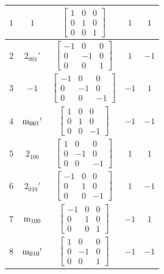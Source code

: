 \documentclass[fleqn,8pt]{jsarticle}
\begin{document}
\begin{longtable}{ccccc}
$ 1 $ & $ 1 $ & $ \begin{bmatrix} 1 & 0 & 0 \\ 0 & 1 & 0 \\ 0 & 0 & 1 \end{bmatrix} $ & $ 1 $ & $ 1 $ \\ \hline
$ 2 $ & $ 2{}_{001}{}' $ & $ \begin{bmatrix} -1 & 0 & 0 \\ 0 & -1 & 0 \\ 0 & 0 & 1 \end{bmatrix} $ & $ 1 $ & $ -1 $ \\ \hline
$ 3 $ & $ -1 $ & $ \begin{bmatrix} -1 & 0 & 0 \\ 0 & -1 & 0 \\ 0 & 0 & -1 \end{bmatrix} $ & $ -1 $ & $ 1 $ \\ \hline
$ 4 $ & $ {\rm m}_{001}{}' $ & $ \begin{bmatrix} 1 & 0 & 0 \\ 0 & 1 & 0 \\ 0 & 0 & -1 \end{bmatrix} $ & $ -1 $ & $ -1 $ \\ \hline
$ 5 $ & $ 2{}_{100} $ & $ \begin{bmatrix} 1 & 0 & 0 \\ 0 & -1 & 0 \\ 0 & 0 & -1 \end{bmatrix} $ & $ 1 $ & $ 1 $ \\ \hline
$ 6 $ & $ 2{}_{010}{}' $ & $ \begin{bmatrix} -1 & 0 & 0 \\ 0 & 1 & 0 \\ 0 & 0 & -1 \end{bmatrix} $ & $ 1 $ & $ -1 $ \\ \hline
$ 7 $ & $ {\rm m}_{100} $ & $ \begin{bmatrix} -1 & 0 & 0 \\ 0 & 1 & 0 \\ 0 & 0 & 1 \end{bmatrix} $ & $ -1 $ & $ 1 $ \\ \hline
$ 8 $ & $ {\rm m}_{010}{}' $ & $ \begin{bmatrix} 1 & 0 & 0 \\ 0 & -1 & 0 \\ 0 & 0 & 1 \end{bmatrix} $ & $ -1 $ & $ -1 $ \\
\end{longtable}
\end{document}
